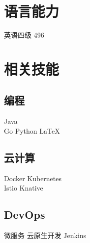\documentclass[]{deedy-resume-openfont}
\begin{document}
\begin{minipage}[t]{0.3\textwidth}
\sectionsep

\section{语言能力}
\sectionsep
英语四级 496 \\
\sectionsep


\section{相关技能}
\sectionsep
\subsection{编程}
Java  \\
Go \textbullet{} Python \textbullet{}  \LaTeX\ \\ 
\sectionsep

\subsection{云计算}
Docker \textbullet{} Kubernetes   \\
Istio \textbullet{} Knative  \\
\sectionsep

\subsection{DevOps}
微服务 \textbullet{} 云原生开发 \textbullet{} Jenkins 
\sectionsep



%
%

\end{minipage}
\end{document}
